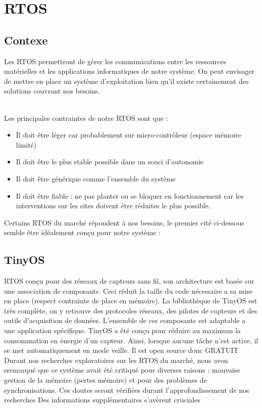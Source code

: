 \section{RTOS}
	\subsection {Contexe}
		Les RTOS permettront de gérer les communications entre les ressources matérielles et les applications informatiques de notre système. On peut envisager de mettre en place un système d'exploitation bien qu'il existe certainement des solutions couvrant nos besoins. \\~
		
		Les principales contraintes de notre RTOS sont que :
		\begin{itemize}
				\item Il doit être léger car probablement sur micro-contrôleur (espace mémoire limité)
				\item Il doit être le plus stable possible dans un souci d'autonomie
				\item Il doit être générique comme l'ensemble du système
				\item Il doit être fiable : ne pas planter ou se bloquer en fonctionnement car les interventions sur les sites doivent être réduites le plus possible.
		\end{itemize}

		Certains RTOS du marché répondent à nos besoins, le premier cité ci-dessous semble être idéalement conçu pour notre système :
		
		\subsection{TinyOS}
		  
{RTOS conçu pour des réseaux de capteurs sans fil, son architecture est basée sur une association de composants.}
{Ceci réduit la taille du code nécessaire a sa mise en place (respect contrainte de place en mémoire). La bibliothèque de TinyOS est très complète, on y retrouve des protocoles réseaux, des pilotes de capteurs et des outils d'acquisition de données. L'ensemble de ces composants est adaptable a une application spécifique.}
{TinyOS a été conçu pour réduire au maximum la consommation en énergie d’un capteur. Ainsi, lorsque aucune tâche n’est active, il se met automatiquement en mode veille.}
{Il est open source donc GRATUIT}
{Durant nos recherches exploratoires sur les RTOS du marché, nous avon sremarqué que ce système avait été critiqué pour diverses raisons : mauvaise
gestion de la mémoire (pertes mémoire) et pour des problèmes de synchronisations. Ces doutes seront vérifiées durant l'approfondissement de nos recherches}
{Des informations supplémentaires s'avèrent cruciales}


